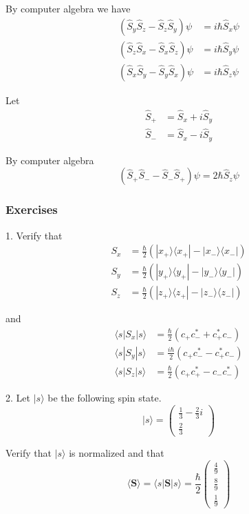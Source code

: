 By computer algebra we have
\begin{align*}
(\hat S_y\hat S_z-\hat S_z\hat S_y)\psi&=i\hbar\hat S_x\psi
\\
(\hat S_z\hat S_x-\hat S_x\hat S_z)\psi&=i\hbar\hat S_y\psi
\\
(\hat S_x\hat S_y-\hat S_y\hat S_x)\psi&=i\hbar\hat S_z\psi
\end{align*}

Let
\begin{align*}
\hat S_+&=\hat S_x+i\hat S_y
\\
\hat S_-&=\hat S_x-i\hat S_y
\end{align*}

By computer algebra
\begin{equation*}
(\hat S_+\hat S_--\hat S_-\hat S_+)\psi=2\hbar\hat S_z\psi
\end{equation*}

\subsubsection*{Exercises}

1. Verify that
\begin{align*}
S_x&=\frac{\hbar}{2}\left(|x_+\rangle\langle x_+|-|x_-\rangle\langle x_-|\right)
\\
S_y&=\frac{\hbar}{2}\left(|y_+\rangle\langle y_+|-|y_-\rangle\langle y_-|\right)
\\
S_z&=\frac{\hbar}{2}\left(|z_+\rangle\langle z_+|-|z_-\rangle\langle z_-|\right)
\end{align*}

and
\begin{align*}
\langle s|S_x|s\rangle&=\frac{\hbar}{2}\left(c_+c_-^*+c_+^*c_-\right)
\\
\langle s|S_y|s\rangle&=\frac{i\hbar}{2}\left(c_+c_-^*-c_+^*c_-\right)
\\
\langle s|S_z|s\rangle&=\frac{\hbar}{2}\left(c_+c_+^*-c_-c_-^*\right)
\end{align*}

2. Let $|s\rangle$ be the following spin state.
\begin{equation*}
|s\rangle=\begin{pmatrix}\frac{1}{3}-\frac{2}{3}i\\[1ex]\frac{2}{3}\end{pmatrix}
\end{equation*}

Verify that $|s\rangle$ is normalized and that
\begin{equation*}
\langle\mathbf S\rangle
=\langle s|\mathbf S|s\rangle
=\frac{\hbar}{2}\begin{pmatrix}\frac{4}{9}\\[1ex]\frac{8}{9}\\[1ex]\frac{1}{9}\end{pmatrix}
\end{equation*}

